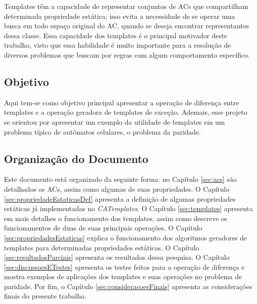Templates têm a capacidade de representar conjuntos de ACs que compartilham determinada propriedade estática; isso evita a necessidade de se operar uma busca em todo espaço original do AC, quando se deseja encontrar representantes dessa classe. Essa capacidade dos templates é o principal motivador deste trabalho, visto que essa habilidade é muito importante para a resolução de diversos problemas que buscam por regras com algum comportamento específico.

\subsection{Objetivo}%
Aqui tem-se como objetivo principal apresentar a operação de diferença entre templates e a operação geradora de templates de exceção. Ademais, esse projeto se orientou por apresentar um exemplo da utilidade de templates em um problema típico de autômatos celulares, o problema da paridade. %

\subsection{Organização do Documento}
Este documento está organizado da seguinte forma: no Capítulo \ref{sec:acs} são detalhados os ACs, assim como algumas de suas propriedades. O Capítulo \ref{sec:propriedadeEstaticasDef} apresenta a definição de  algumas propriedades estáticas já implementadas no \textit{CATemplates}. O Capítulo \ref{sec:templates} apresenta em mais detalhes o funcionamento dos templates, assim como descreve os funcionamentos de duas de suas principais operações. O Capítulo \ref{sec:propriedadesEstaticas} explica o funcionamento dos algoritmos geradores de templates para determinadas propriedades estáticas. O Capítulo \ref{sec:resultadosParciais} apresenta os resultados dessa pesquisa. O Capítulo \ref{sec:discussoesETestes} apresenta os testes feitos para a operação de diferença e mostra exemplos de aplicações dos templates e  suas operações no problema de paridade. Por fim, o Capítulo \ref{sec:consideracoesFinais} apresenta as considerações finais do presente trabalho.